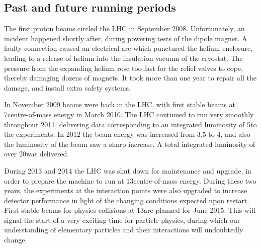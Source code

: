 \subsection{Past and future running periods}

The first proton beams circled the LHC in September 2008. Unfortunately, an incident happened
shortly after, during powering tests of the dipole magnet. A faulty connection caused  an electrical
arc which punctured the helium enclosure, leading to a release of helium into the insulation vacuum
of
the cryostat. The pressure from the expanding helium rose too fast for the relief valves to cope,
thereby damaging dozens of magnets. It took more than one year to repair all the damage, and
install extra safety systems. 

In November 2009 beams were back in the LHC, with first stable beams
at 7\TeV centre-of-mass energy in March 2010. The LHC continued to run very smoothly throughout
2011, delivering data corresponding to an integrated luminosity of 5\fbinv to the experiments.  
In 2012 the beam energy was increased from 3.5 to 4\TeV, and also the luminosity of the beam saw a
sharp increase. A total integrated luminosity of over 20\fbinv was delivered. 

During 2013 and 2014 the LHC was shut down for maintenance and upgrade, in order to prepare the
machine to run at 13\TeV centre-of-mass energy. During these two years, the experiments at the
interaction points were also upgraded to increase detector performance in light of the changing
conditions expected upon restart. 
First stable beams for physics collisions at 13\TeV are planned for June 2015. This will signal the
start of a very exciting time for particle physics, during which our understanding of elementary
particles and their interactions will undoubtedly change. 


